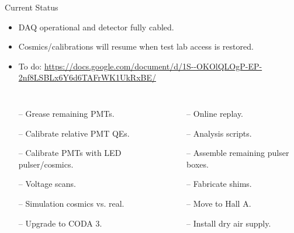 \documentclass[10pt]{beamer}
\begin{document}
\begin{frame}{Current Status}

	\begin{itemize}
		\item {}\alert{DAQ operational and detector fully cabled.}
		\item {}\alert{Cosmics/calibrations will resume when test lab access is restored.}
		\item {}\alert{To do:} \url{https://docs.google.com/document/d/1S--OKOlQLOgP-EP-2nf8LSBLx6Y6d6TAFrWK1UkRxBE/}
	\end{itemize}
	
	\vspace{-2.5mm}
	\begin{columns}[T,onlytextwidth]

			\begin{itemize}\itemsep0pt \parskip0pt 
				\item[--] \footnotesize{Grease remaining PMTs.}
				\item[--] \footnotesize{Calibrate relative PMT QEs.}
				\item[--] \footnotesize{Calibrate PMTs with LED pulser/cosmics.}
				\item[--] \footnotesize{Voltage scans.}
				\item[--] \footnotesize{Simulation cosmics vs. real.}
				\item[--] \footnotesize{Upgrade to CODA 3.}
			\end{itemize}
				
			\begin{itemize}\itemsep0pt \parskip0pt 
				\item[--] \footnotesize{Online replay.}
				\item[--] \footnotesize{Analysis scripts.}
				\item[--] \footnotesize{Assemble remaining pulser boxes.}
				\item[--] \footnotesize{Fabricate shims.}
				\item[--] \footnotesize{Move to Hall A.}
				\item[--] \footnotesize{Install dry air supply.}
			\end{itemize}
			\end{columns}
				

\end{frame}
\end{document}
